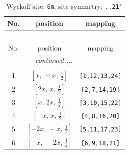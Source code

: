 \documentclass[fleqn,8pt]{jsarticle}
\begin{document}
\renewcommand{\arraystretch}{1.2}
\begin{longtable}{ccc}
\caption{Wyckoff site: {\tt 6m}, site symmetry: {\tt ..21'}}
 \\
 \hline \hline
No. & position & mapping \\ \hline \endfirsthead

\multicolumn{2}{l}{\tablename\ \thetable{}} \\
 \hline \hline
No. & position & mapping \\ \hline \endhead

 \hline \hline
\multicolumn{2}{r}{\footnotesize\it continued ...} \\ \endfoot

 \hline \hline
\multicolumn{2}{r}{} \\ \endlastfoot

1 & $\left[ x,\, - x,\, \frac{1}{2} \right]$ & {\tt [1,12,13,24]} \\ \hline
2 & $\left[ 2 x,\, x,\, \frac{1}{2} \right]$ & {\tt [2,7,14,19]} \\ \hline
3 & $\left[ x,\, 2 x,\, \frac{1}{2} \right]$ & {\tt [3,10,15,22]} \\ \hline
4 & $\left[ - x,\, x,\, \frac{1}{2} \right]$ & {\tt [4,8,16,20]} \\ \hline
5 & $\left[ - 2 x,\, - x,\, \frac{1}{2} \right]$ & {\tt [5,11,17,23]} \\ \hline
6 & $\left[ - x,\, - 2 x,\, \frac{1}{2} \right]$ & {\tt [6,9,18,21]} \\
\end{longtable}
\renewcommand{\arraystretch}{1.2}
\end{document}
